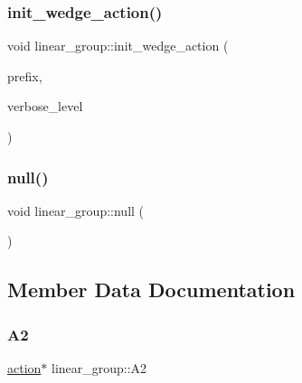 \mbox{\label{classlinear__group_a16a8a2a5fdc535f2263210ca7943119e}} 
\subsubsection{\texorpdfstring{init\+\_\+wedge\+\_\+action()}{init\_wedge\_action()}}
{\footnotesize\ttfamily void linear\+\_\+group\+::init\+\_\+wedge\+\_\+action (\begin{DoxyParamCaption}\item[{\mbox{\hyperlink{galois_8h_ab6cc7b4aeb6ea31aba2b3fbfc83ff5e6}{B\+Y\+TE}} $\ast$}]{prefix,  }\item[{\mbox{\hyperlink{galois_8h_a09fddde158a3a20bd2dcadb609de11dc}{I\+NT}}}]{verbose\+\_\+level }\end{DoxyParamCaption})}

\mbox{\label{classlinear__group_a544310cc78672c79460a2281c324312c}} 
\subsubsection{\texorpdfstring{null()}{null()}}
{\footnotesize\ttfamily void linear\+\_\+group\+::null (\begin{DoxyParamCaption}{ }\end{DoxyParamCaption})}



\subsection{Member Data Documentation}
\mbox{\label{classlinear__group_a436d7238ca25fa9af7c91836e9c5cc7e}} 
\subsubsection{\texorpdfstring{A2}{A2}}
{\footnotesize\ttfamily \mbox{\hyperlink{classaction}{action}}$\ast$ linear\+\_\+group\+::\+A2}

